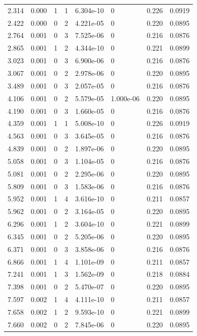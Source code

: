 \documentclass[preview]{standalone}
\begin{document}
{{\begin{tabular}{L{1.2cm}C{1.2cm} C{0.3cm}C{0.5cm} C{1.4cm}C{1.4cm} C{1.4cm}C{1.4cm}}
  2.314  &  0.000  & 1     &  1 &  6.304e-10  & 0  & 0.226 &  0.0919   \\ 
  2.422  &  0.000  & 0     &  2 &  4.221e-05  & 0  & 0.220 &  0.0895   \\ 
  2.764  &  0.001  & 0     &  3 &  7.525e-06  & 0  & 0.216 &  0.0876   \\ 
  2.865  &  0.001  & 1     &  2 &  4.344e-10  & 0  & 0.221 &  0.0899   \\ 
  3.023  &  0.001  & 0     &  3 &  6.900e-06  & 0  & 0.216 &  0.0876   \\ 
  3.067  &  0.001  & 0     &  2 &  2.978e-06  & 0  & 0.220 &  0.0895   \\ 
  3.489  &  0.001  & 0     &  3 &  2.057e-05  & 0  & 0.216 &  0.0876   \\ 
  4.106  &  0.001  & 0     &  2 &  5.579e-05  & 1.000e-06  & 0.220 &  0.0895   \\ 
  4.190  &  0.001  & 0     &  3 &  1.660e-05  & 0  & 0.216 &  0.0876   \\ 
  4.359  &  0.001  & 1     &  1 &  5.008e-10  & 0  & 0.226 &  0.0919   \\ 
  4.563  &  0.001  & 0     &  3 &  3.645e-05  & 0  & 0.216 &  0.0876   \\ 
  4.839  &  0.001  & 0     &  2 &  1.897e-06  & 0  & 0.220 &  0.0895   \\ 
  5.058  &  0.001  & 0     &  3 &  1.104e-05  & 0  & 0.216 &  0.0876   \\ 
  5.081  &  0.001  & 0     &  2 &  2.295e-06  & 0  & 0.220 &  0.0895   \\ 
  5.809  &  0.001  & 0     &  3 &  1.583e-06  & 0  & 0.216 &  0.0876   \\ 
  5.952  &  0.001  & 1     &  4 &  3.616e-10  & 0  & 0.211 &  0.0857   \\ 
  5.962  &  0.001  & 0     &  2 &  3.164e-05  & 0  & 0.220 &  0.0895   \\ 
  6.296  &  0.001  & 1     &  2 &  3.604e-10  & 0  & 0.221 &  0.0899   \\ 
  6.345  &  0.001  & 0     &  2 &  5.205e-06  & 0  & 0.220 &  0.0895   \\ 
  6.371  &  0.001  & 0     &  3 &  3.858e-06  & 0  & 0.216 &  0.0876   \\ 
  6.866  &  0.001  & 1     &  4 &  1.101e-09  & 0  & 0.211 &  0.0857   \\ 
  7.241  &  0.001  & 1     &  3 &  1.562e-09  & 0  & 0.218 &  0.0884   \\ 
  7.398  &  0.001  & 0     &  2 &  5.470e-07  & 0  & 0.220 &  0.0895   \\ 
  7.597  &  0.002  & 1     &  4 &  4.111e-10  & 0  & 0.211 &  0.0857   \\ 
  7.658  &  0.002  & 1     &  2 &  9.593e-10  & 0  & 0.221 &  0.0899   \\ 
  7.660  &  0.002  & 0     &  2 &  7.845e-06  & 0  & 0.220 &  0.0895   \\ 
\hline 
\end{tabular} 

}}
\end{document}
